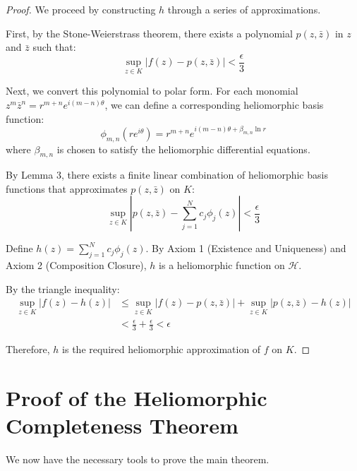 \begin{proof}
We proceed by constructing $h$ through a series of approximations.

First, by the Stone-Weierstrass theorem, there exists a polynomial $p(z, \bar{z})$ in $z$ and $\bar{z}$ such that:
\begin{equation}
\sup_{z \in K} |f(z) - p(z, \bar{z})| < \frac{\epsilon}{3}
\end{equation}

Next, we convert this polynomial to polar form. For each monomial $z^m\bar{z}^n = r^{m+n}e^{i(m-n)\theta}$, we can define a corresponding heliomorphic basis function:
\begin{equation}
\phi_{m,n}(re^{i\theta}) = r^{m+n}e^{i(m-n)\theta + \beta_{m,n}\ln r}
\end{equation}
where $\beta_{m,n}$ is chosen to satisfy the heliomorphic differential equations.

By Lemma 3, there exists a finite linear combination of heliomorphic basis functions that approximates $p(z, \bar{z})$ on $K$:
\begin{equation}
\sup_{z \in K} |p(z, \bar{z}) - \sum_{j=1}^{N} c_j\phi_j(z)| < \frac{\epsilon}{3}
\end{equation}

Define $h(z) = \sum_{j=1}^{N} c_j\phi_j(z)$. By Axiom 1 (Existence and Uniqueness) and Axiom 2 (Composition Closure), $h$ is a heliomorphic function on $\mathcal{H}$.

By the triangle inequality:
\begin{align}
\sup_{z \in K} |f(z) - h(z)| &\leq \sup_{z \in K} |f(z) - p(z, \bar{z})| + \sup_{z \in K} |p(z, \bar{z}) - h(z)|\\
&< \frac{\epsilon}{3} + \frac{\epsilon}{3} < \epsilon
\end{align}

Therefore, $h$ is the required heliomorphic approximation of $f$ on $K$.
\end{proof}

\section{Proof of the Heliomorphic Completeness Theorem}

We now have the necessary tools to prove the main theorem.

